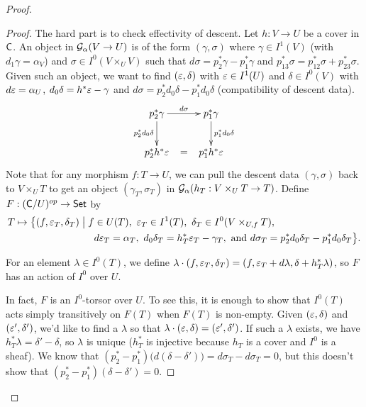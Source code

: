 \begin{proof}
\begin{proof}
  The hard part is to check effectivity of descent. Let $h:V\to U$ be a cover in $\text{\sf C}$. An object in $\mathcal{G}_\alpha(V\to U)$ is of the form $(\gamma,\sigma)$ where $\gamma\in I^1(V)$ (with $d_1\gamma=\alpha_V$) and $\sigma\in I^0(V\times_U V)$ such that $d\sigma=p_2^*\gamma-p_1^*\gamma$ and $p_{13}^*\sigma=p_{12}^*\sigma+p_{23}^*\sigma$. Given such an object, we want to find $(\varepsilon,\delta)$ with $\varepsilon\in I^1(U)$ and $\delta\in I^0(V)$ with $d\varepsilon=\alpha_U$, $d_0\delta=h^*\varepsilon-\gamma$ and $d\sigma=p_2^*d_0\delta-p_1^*d_0\delta$ (compatibility of descent data).
  \[\xymatrix{
   p_2^*\gamma \ar[r]^{d\sigma} \ar[d]_{p_2^* d_0\delta} & p_1^*\gamma\ar[d]^{p_1^* d_0\delta}\\
   p_2^*h^*\e \ar@{}[r]|<>(.5){\mbox{$=$}} & p_1^*h^*\e
  }\]
  Note that for any morphism $f:T\to U$, we can pull the descent data $(\gamma,\sigma)$ back to $V\times_U T$ to get an object $(\gamma_T,\sigma_T)$ in $\mathcal{G}_\alpha(h_T:V\times_U T\to T)$. Define $F:(\text{\sf C}/U)^{op}\to \text{\sf Set}$ by
 \begin{align*}
   T\mapsto\bigl\{(f,\varepsilon_T,\delta_T)\bigm|f&\in U(T),\ \varepsilon_T\in I^1(T),\ \delta_T\in I^0(V\times_{U,f} T),\\
   & d\varepsilon_T=\alpha_T,\ d_0\delta_T=h_T^*\varepsilon_T-\gamma_T,\text{ and } d\sigma_T=p_2^*d_0\delta_T-p_1^*d_0\delta_T\bigr\}.
 \end{align*}
 
 For an element $\lambda\in I^0(T)$, we define $\lambda\cdot (f,\varepsilon_T,\delta_T)=(f,\varepsilon_T+d\lambda,\delta+h_T^*\lambda)$, so $F$ has an action of $I^0$ over $U$.

 In fact, $F$ is an $I^0$-torsor over $U$. To see this, it is enough to show that $I^0(T)$ acts simply transitively on $F(T)$ when $F(T)$ is non-empty. Given $(\varepsilon,\delta)$ and $(\varepsilon',\delta')$, we'd like to find a $\lambda$ so that $\lambda\cdot (\varepsilon,\delta)=(\varepsilon',\delta')$. If such a $\lambda$ exists, we have $h_T^*\lambda=\delta'-\delta$, so $\lambda$ is unique ($h_T^*$ is injective because $h_T$ is a cover and $I^0$ is a sheaf). We know that $(p_2^*-p_1^*)\bigl(d(\delta-\delta')\bigr)= d\sigma_T-d\sigma_T =0$, but this doesn't show that $(p_2^*-p_1^*)(\delta-\delta')=0$.


\end{proof}
\end{proof}
